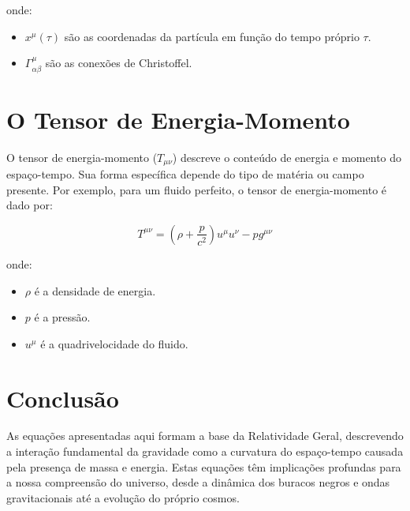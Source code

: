\documentclass[a4paper,12pt]{article}
\begin{document}
onde:
\begin{itemize}
    \item $x^\mu(\tau)$ são as coordenadas da partícula em função do tempo próprio $\tau$.
    \item $\Gamma^\mu_{\alpha\beta}$ são as conexões de Christoffel.
\end{itemize}

\section{O Tensor de Energia-Momento}

O tensor de energia-momento ($T_{\mu\nu}$) descreve o conteúdo de energia e momento do espaço-tempo. Sua forma específica depende do tipo de matéria ou campo presente. Por exemplo, para um fluido perfeito, o tensor de energia-momento é dado por:

$$T^{\mu\nu} = (\rho + \frac{p}{c^2}) u^\mu u^\nu - p g^{\mu\nu}$$

onde:
\begin{itemize}
    \item $\rho$ é a densidade de energia.
    \item $p$ é a pressão.
    \item $u^\mu$ é a quadrivelocidade do fluido.
\end{itemize}

\section{Conclusão}

As equações apresentadas aqui formam a base da Relatividade Geral, descrevendo a interação fundamental da gravidade como a curvatura do espaço-tempo causada pela presença de massa e energia. Estas equações têm implicações profundas para a nossa compreensão do universo, desde a dinâmica dos buracos negros e ondas gravitacionais até a evolução do próprio cosmos.
\end{document}
